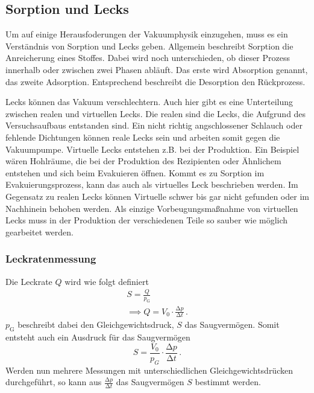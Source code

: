     \subsection{Sorption und Lecks}
        Um auf einige Herausfoderungen der Vakuumphysik einzugehen, muss es ein Verständnis von Sorption und Lecks geben.
        Allgemein beschreibt Sorption die Anreicherung eines Stoffes.
        Dabei wird noch unterschieden, ob dieser Prozess innerhalb oder zwischen zwei Phasen abläuft.
        Das erste wird Absorption genannt, das zweite Adsorption.
        Entsprechend beschreibt die Desorption den Rückprozess.

        \noindent
        Lecks können das Vakuum verschlechtern.
        Auch hier gibt es eine Unterteilung zwischen realen und virtuellen Lecks.
        Die realen sind die Lecks, die Aufgrund des Versuchsaufbaus entstanden sind.
        Ein nicht richtig angschlossener Schlauch oder fehlende Dichtungen können reale Lecks sein und arbeiten somit gegen die Vakuumpumpe.
        Virtuelle Lecks entstehen z.B. bei der Produktion.
        Ein Beispiel wären Hohlräume, die bei der Produktion des Rezipienten oder Ähnlichem entstehen und sich beim Evakuieren öffnen.
        Kommt es zu Sorption im Evakuierungsprozess, kann das auch als virtuelles Leck beschrieben werden.
        Im Gegensatz zu realen Lecks können Virtuelle schwer bis gar nicht gefunden oder im Nachhinein behoben werden.
        Als einzige Vorbeugungsmaßnahme von virtuellen Lecks muss in der Produktion der verschiedenen Teile so sauber wie möglich gearbeitet werden.
        
        \subsubsection{Leckratenmessung}
            Die Leckrate $Q$ wird wie folgt definiert
            \begin{align*}
                S= \frac{Q}{p_\text{G}} \\
                \implies Q = V_0 \cdot \frac{\increment p}{\increment t} \, .
            \end{align*}
            $p_\text{G}$ beschreibt dabei den Gleichgewichtsdruck, $S$ das Saugvermögen.
            Somit entsteht auch ein Ausdruck für das Saugvermögen
            \begin{equation}
                S = \frac{V_0}{p_G} \cdot \frac{\increment p}{\increment t} \, .
                \label{eq:saug_leck_theorie}
            \end{equation}
            Werden nun mehrere Messungen mit unterschiedlichen Gleichgewichtsdrücken durchgeführt, so kann aus $\frac{\increment p}{\increment t}$ das Saugvermögen $S$ bestimmt werden.

